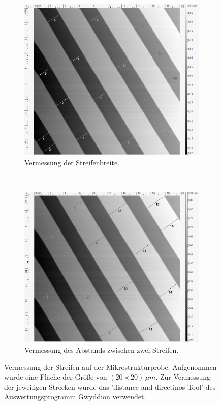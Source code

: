 %
\begin{figure}[H]
\centering
	\begin{subfigure}[t]{0.45\textwidth}
	\includegraphics[width=\textwidth]{AFM_auswertung/streif_durch_vor.png}
	\caption{Vermessung der Streifenbreite.}
	\label{abb:streifa}
	\end{subfigure}
	~
	\begin{subfigure}[t]{0.45\textwidth}
	\includegraphics[width=\textwidth]{AFM_auswertung/streif_abb_vor.png}
	\caption{Vermessung des Abstands zwischen zwei Streifen.}
	\label{abb:streifb}
	\end{subfigure}
\caption{Vermessung der Streifen auf der Mikrostrukturprobe. Aufgenommen wurde eine Fl\"ache der Gr\"o{\ss}e von $(20 \times 20) \, \mu m$. Zur Vermessung der jeweiligen Strecken wurde das 'distance and directinos-Tool' des Auswertungsprogramm Gwyddion verwendet.}
\label{abb:streif}
\end{figure}

